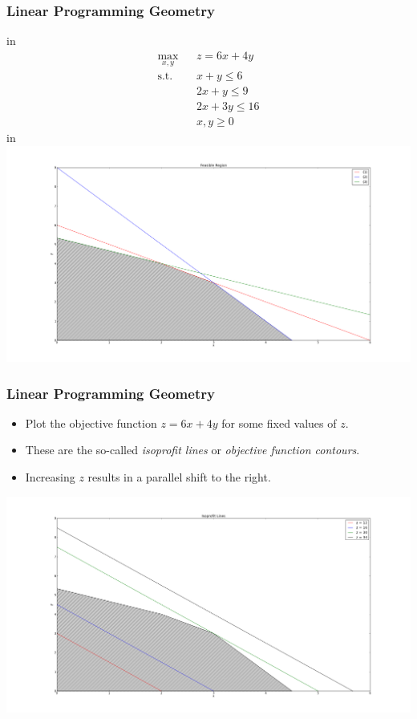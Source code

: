 \documentclass[12pt,handout]{beamer}
\begin{document}
\begin{frame}
\frametitle{Linear Programming Geometry}
 in
\tiny
\begin{eqnarray}
\max_{x,y} && z = 6x + 4y \nonumber \\
\mbox{s.t.} && x + y \le 6 \\
&& 2x + y \le 9 \\
&& 2x + 3y \le 16 \\
&& x, y \ge 0 \nonumber
\end{eqnarray}
 in
\includegraphics[scale=0.2]{feasible_region.png}
\end{frame}

\begin{frame}
\frametitle{Linear Programming Geometry}
\tiny
\begin{itemize}
\item Plot the objective function $z = 6x + 4y$ for some fixed values of $z$.
\item These are the so-called {\em isoprofit lines} or {\em objective function contours}.
\item Increasing $z$ results in a parallel shift to the right.
\end{itemize}
\includegraphics[scale=0.2]{isoprofit_lines.png}
\end{frame}
\end{document}
